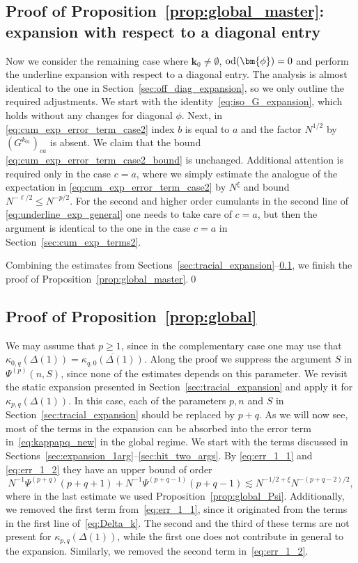 \documentclass[10pt]{amsart}
\numberwithin{equation}{section}
\begin{document}
\subsection{Proof of Proposition~\ref{prop:global_master}: expansion with respect to a diagonal entry}\label{sec:diag_expansion}

Now we consider the remaining case where $\bm{k}_0\neq\emptyset$, ${\rm{od}}(\bm{\phi})=0$ and perform the underline expansion with respect to a diagonal entry. The analysis is almost identical to the one in Section~\ref{sec:off_diag_expansion}, so we only outline the required adjustments. We start with the identity~\eqref{eq:iso_G_expansion}, which holds without any changes for diagonal $\phi$. Next, in \eqref{eq:cum_exp_error_term_case2} index $b$ is equal to $a$ and the factor $N^{1/2}$ by $(G^{k_{01}})_{ca}$ is absent. We claim that the bound \eqref{eq:cum_exp_error_term_case2_bound} is unchanged. Additional attention is required only in the case $c=a$, where we simply estimate the analogue of the expectation in \eqref{eq:cum_exp_error_term_case2} by $N^\xi$ and bound $N^{-\ell/2}\le N^{-p/2}$. For the second and higher order cumulants in the second line of \eqref{eq:underline_exp_general} one needs to take care of $c=a$, but then the argument is identical to the one in the case $c=a$ in Section~\ref{sec:cum_exp_terms2}.

Combining the estimates from Sections~\ref{sec:tracial_expansion}--\ref{sec:diag_expansion}, we finish the proof of Proposition~\ref{prop:global_master}.\hfill\qed 


\subsection{Proof of Proposition~\ref{prop:global}}\label{sec:proof_global} We may assume that $p\ge 1$, since in the complementary case one may use that $\kappa_{0,q}(\Delta(1)) = \overline{\kappa_{q,0}(\Delta(1))}$. Along the proof we suppress the argument $S$ in $\Psi^{(p)}(n,S)$, since none of the estimates depends on this parameter. We revisit the static expansion presented in Section~\ref{sec:tracial_expansion} and apply it for $\kappa_{p,q}(\Delta(1))$. In this case, each of the parameters $p,n$ and $S$ in Section~\ref{sec:tracial_expansion} should be replaced by $p+q$. As we will now see, most of the terms in the expansion can be absorbed into the error term in~\eqref{eq:kappapq_new} in the global regime. We start with the terms discussed in Sections~\ref{sec:expansion_1arg}--\ref{sec:hit_two_args}. By \eqref{eq:err_1_1} and \eqref{eq:err_1_2} they have an upper bound of order
\begin{equation}
N^{-1}\Psi^{(p+q)}(p+q+1) + N^{-1}\Psi^{(p+q-1)}(p+q-1) \lesssim N^{-1/2+\xi} N^{-(p+q-2)/2},
\end{equation}
where in the last estimate we used Proposition~\ref{prop:global_Psi}. Additionally, we removed the first term from~\eqref{eq:err_1_1}, since it originated from the terms in the first line of~\eqref{eq:Delta_k}. The second and the third of these terms are not present for $\kappa_{p,q}(\Delta(1))$, while the first one does not contribute in general to the expansion. Similarly, we removed the second term in~\eqref{eq:err_1_2}. 
\end{document}
